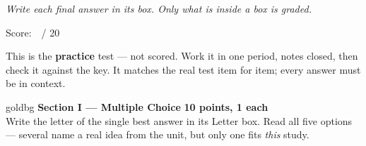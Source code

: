\documentclass[12pt]{article}
\begin{document}
{\small\itshape Write each final answer in its box. Only what is inside a box is graded.}\par

{\small\hfill Score:\ \blank{1.4cm}\ / 20}

\vspace{0.06in}

\boxguard[8]
\begin{remindbox}
\small
This is the \textbf{practice} test --- not scored. Work it in one period, notes closed, then check
it against the key. It matches the real test item for item; every answer must be in context.
\end{remindbox}

\vspace{0.10in}

\boxguard[16]
\begin{headlinebox}{goldbg}
\small
\textbf{Section I --- Multiple Choice} \hfill \textbf{10 points, 1 each}\\
Write the letter of the single best answer in its Letter box. Read all five options --- several
name a real idea from the unit, but only one fits \emph{this} study.
\end{headlinebox}

\vspace{0.10in}
\end{document}

